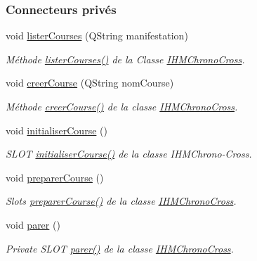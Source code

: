 \subsubsection*{Connecteurs privés}
\begin{DoxyCompactItemize}
\item 
void \hyperlink{class_i_h_m_chrono_cross_a1b9f117d7097b63ddabe168a5349a7e8}{lister\+Courses} (Q\+String manifestation)
\begin{DoxyCompactList}\small\item\em Méthode \hyperlink{class_i_h_m_chrono_cross_a1b9f117d7097b63ddabe168a5349a7e8}{lister\+Courses()} de la Classe \hyperlink{class_i_h_m_chrono_cross}{I\+H\+M\+Chrono\+Cross}. \end{DoxyCompactList}\item 
void \hyperlink{class_i_h_m_chrono_cross_a3fc01e539c59645e0655e56e440f4b83}{creer\+Course} (Q\+String nom\+Course)
\begin{DoxyCompactList}\small\item\em Méthode \hyperlink{class_i_h_m_chrono_cross_a3fc01e539c59645e0655e56e440f4b83}{creer\+Course()} de la classe \hyperlink{class_i_h_m_chrono_cross}{I\+H\+M\+Chrono\+Cross}. \end{DoxyCompactList}\item 
void \hyperlink{class_i_h_m_chrono_cross_adde019cc3799befac3fd9555e392eab9}{initialiser\+Course} ()
\begin{DoxyCompactList}\small\item\em S\+L\+OT \hyperlink{class_i_h_m_chrono_cross_adde019cc3799befac3fd9555e392eab9}{initialiser\+Course()} de la classe I\+H\+M\+Chrono-\/\+Cross. \end{DoxyCompactList}\item 
void \hyperlink{class_i_h_m_chrono_cross_a4926e7524f4fd76ccceb0aef5ebcb203}{preparer\+Course} ()
\begin{DoxyCompactList}\small\item\em Slots \hyperlink{class_i_h_m_chrono_cross_a4926e7524f4fd76ccceb0aef5ebcb203}{preparer\+Course()} de la classe \hyperlink{class_i_h_m_chrono_cross}{I\+H\+M\+Chrono\+Cross}. \end{DoxyCompactList}\item 
void \hyperlink{class_i_h_m_chrono_cross_aa272ffa273fc8c487ea64ef6a43b4439}{parer} ()
\begin{DoxyCompactList}\small\item\em Private S\+L\+OT \hyperlink{class_i_h_m_chrono_cross_aa272ffa273fc8c487ea64ef6a43b4439}{parer()} de la classe \hyperlink{class_i_h_m_chrono_cross}{I\+H\+M\+Chrono\+Cross}. \end{DoxyCompactList}\item 

\end{DoxyCompactItemize}
